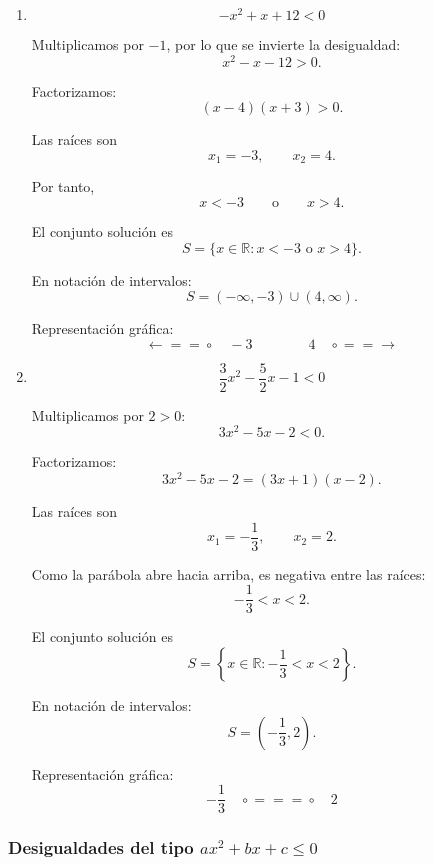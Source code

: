 \documentclass[12pt]{article}
\begin{document}
{\begin{enumerate}
En notación de intervalos:
\[
\boxed{
S=(-\infty,1)\cup(3,\infty).
}
\]

Representación gráfica:
\[
\longleftarrow\!\!=\!\!=\!\circ
\quad1
\qquad\qquad
3\quad
\circ\!\!=\!\!=\!\longrightarrow
\]

\item
\[
-x^2+x+12<0
\]

Multiplicamos por \(-1\), por lo que se invierte la desigualdad:
\[
x^2-x-12>0.
\]

Factorizamos:
\[
(x-4)(x+3)>0.
\]

Las raíces son
\[
x_1=-3,
\qquad
x_2=4.
\]

Por tanto,
\[
x<-3
\qquad\text{o}\qquad
x>4.
\]

El conjunto solución es
\[
\boxed{
S=
\{x\in\mathbb{R}:x<-3\text{ o }x>4\}.
}
\]

En notación de intervalos:
\[
\boxed{
S=(-\infty,-3)\cup(4,\infty).
}
\]

Representación gráfica:
\[
\longleftarrow\!\!=\!\!=\!\circ
\quad-3
\qquad\qquad
4\quad
\circ\!\!=\!\!=\!\longrightarrow
\]

\item
\[
\frac{3}{2}x^2-\frac{5}{2}x-1<0
\]

Multiplicamos por \(2>0\):
\[
3x^2-5x-2<0.
\]

Factorizamos:
\[
3x^2-5x-2=(3x+1)(x-2).
\]

Las raíces son
\[
x_1=-\frac{1}{3},
\qquad
x_2=2.
\]

Como la parábola abre hacia arriba, es negativa entre las raíces:
\[
-\frac{1}{3}<x<2.
\]

El conjunto solución es
\[
\boxed{
S=
\left\{
x\in\mathbb{R}:
-\frac{1}{3}<x<2
\right\}.
}
\]

En notación de intervalos:
\[
\boxed{
S=
\left(-\frac{1}{3},2\right).
}
\]

Representación gráfica:
\[
-\frac{1}{3}\quad
\circ\!\!=\!\!=\!\!=\!\circ
\quad2
\]

\end{enumerate}

\subsubsection*{Desigualdades del tipo \(ax^2+bx+c\leq0\)}

\begin{enumerate}


\end{enumerate}}
\end{document}
